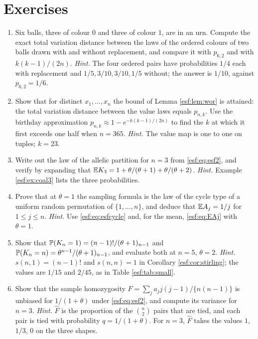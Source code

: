 \section{Exercises}
\label{esf:sec:exercises}

\begin{enumerate}[label=\arabic*., leftmargin=*]

\item Six balls, three of colour $0$ and three of colour $1$, are in an urn. Compute
the exact total variation distance between the laws of the ordered colours of two
balls drawn with and without replacement, and compare it with $p_{6,2}$ and with
$k(k-1)/(2n)$.
\emph{Hint.} The four ordered pairs have probabilities $1/4$ each with replacement and
$1/5, 3/10, 3/10, 1/5$ without; the answer is $1/10$, against $p_{6,2} = 1/6$.

\item Show that for distinct $x_1,\dots,x_n$ the bound of Lemma \ref{esf:lem:wor} is
attained: the total variation distance between the value laws equals $p_{n,k}$. Use
the birthday approximation $p_{n,k} \approx 1 - e^{-k(k-1)/(2n)}$ to find the $k$ at
which it first exceeds one half when $n = 365$.
\emph{Hint.} The value map is one to one on tuples; $k = 23$.

\item Write out the law of the allelic partition for $n = 3$ from
\eqref{esf:eq:esf2}, and verify by expanding that $\mathbb{E} K_3 = 1 + \theta/(\theta+1) +
\theta/(\theta+2)$.
\emph{Hint.} Example \ref{esf:ex:coal3} lists the three probabilities.

\item Prove that at $\theta = 1$ the sampling formula is the law of the cycle type of a
uniform random permutation of $\{1,\dots,n\}$, and deduce that $\mathbb{E} A_j = 1/j$ for
$1 \le j \le n$.
\emph{Hint.} Use \eqref{esf:eq:esfcycle} and, for the mean, \eqref{esf:eq:EAj} with
$\theta = 1$.

\item Show that $\mathbb{P}(K_n = 1) = (n-1)!/(\theta+1)_{n-1}$ and
$\mathbb{P}(K_n = n) = \theta^{n-1}/(\theta+1)_{n-1}$, and evaluate both at $n = 5$,
$\theta = 2$.
\emph{Hint.} $s(n,1) = (n-1)!$ and $s(n,n) = 1$ in Corollary \ref{esf:cor:stirling};
the values are $1/15$ and $2/45$, as in Table \ref{esf:tab:small}.

\item Show that the sample homozygosity $\hat F = \sum_j a_j j(j-1)/\{n(n-1)\}$ is
unbiased for $1/(1+\theta)$ under \eqref{esf:eq:esf2}, and compute its variance for
$n = 3$.
\emph{Hint.} $\hat F$ is the proportion of the $\binom{n}{2}$ pairs that are tied, and
each pair is tied with probability $q = 1/(1+\theta)$. For $n = 3$, $\hat F$ takes the
values $1$, $1/3$, $0$ on the three shapes.


\end{enumerate}

